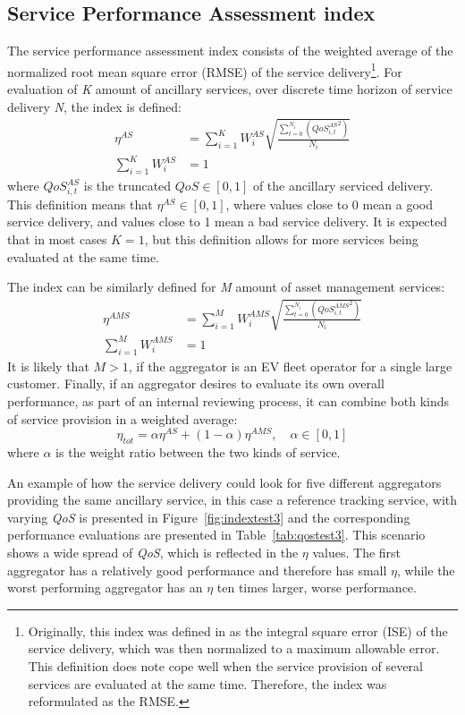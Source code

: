 \subsection{Service Performance Assessment index}
The service performance assessment index consists of the weighted average of the normalized root mean square error (RMSE) of the service delivery\footnote{Originally, this index was defined in \cite{bondy2014performance} as the integral square error (ISE) of the service delivery, which was then normalized to a maximum allowable error. This definition does note cope well when the service provision of several services are evaluated at the same time. Therefore, the index was reformulated as the RMSE.}. For evaluation of \emph{K} amount of ancillary services, over discrete time horizon of service delivery \emph{N}, the index is defined:
\begin{align}\label{eq:MAINetaAS}
\eta^{AS} &= \sum^{K}_{i=1} W^{AS}_i \sqrt{\frac{\sum^{N_i}_{t=0} \left( {QoS^{AS}_{i,t}}^{2} \right)}{N_i}}\\
\sum_{i=1}^K W^{AS}_i &= 1 \label{eq:was}
\end{align}
where $QoS^{AS}_{i,t}$ is the truncated $QoS \in [0,1]$ of the ancillary serviced delivery. This definition means that $\eta^{AS} \in [0,1]$, where values close to 0 mean a good service delivery, and values close to 1 mean a bad service delivery. It is expected that in most cases $K=1$, but this definition allows for more services being evaluated at the same time.

The index can be similarly defined for \emph{M} amount of asset management services:
\begin{align}\label{eq:MAINetaAMS}
\eta^{AMS} &= \sum^{M}_{i=1} W^{AMS}_i \sqrt{\frac{\sum^{N_i}_{t=0} \left( {QoS^{AMS}_{i,t}}^{2} \right)}{N_i}}\\
\sum_{i=1}^M W^{AMS}_i &= 1 \label{eq:wams}
\end{align}
It is likely that $M > 1$, \eg if the aggregator is an EV fleet operator for a single large customer. Finally, if an aggregator desires to evaluate its own overall performance, \eg as part of an internal reviewing process, it can combine both kinds of service provision in a weighted average:
\begin{equation}
\eta_{tot} = \alpha \eta^{AS} + (1-\alpha) \eta^{AMS}, \quad \alpha \in [0,1]
\end{equation}
where $\alpha$ is the weight ratio  between the two kinds of service. 

An example of how the service delivery could look for five different aggregators providing the same ancillary service, in this case a reference tracking service, with varying \emph{QoS} is presented in Figure~\ref{fig:indextest3} and the corresponding performance evaluations are presented in Table~\ref{tab:qostest3}. This scenario shows a wide spread of \emph{QoS}, which is reflected in the $\eta$ values. The first aggregator has a relatively good performance and therefore has small $\eta$, while the worst performing aggregator has an $\eta$ ten times larger, \ie worse performance.

